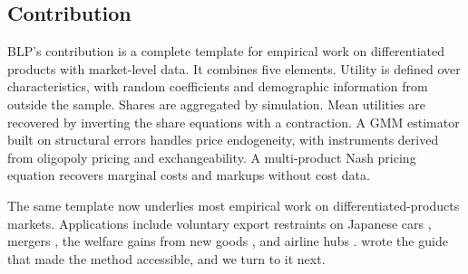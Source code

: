 \subsection{Contribution}\label{sec:08-blp95-contrib}

BLP's contribution is a complete template for empirical work on differentiated products with market-level
data. It combines five elements. Utility is defined over characteristics, with random coefficients and
demographic information from outside the sample. Shares are aggregated by simulation. Mean utilities
are recovered by inverting the share equations with a contraction. A GMM estimator built on structural
errors handles price endogeneity, with instruments derived from oligopoly pricing and exchangeability.
A multi-product Nash pricing equation recovers marginal costs and markups without cost data.

The same template now underlies most empirical work on differentiated-products markets. Applications
include voluntary export restraints on Japanese cars \citep{BerryLevinsohnPakes1999}, mergers
\citep[\cref{ch:mergers}]{Nevo2000b}, the welfare gains from new goods
\citep[\cref{ch:newgoods}]{Petrin2002}, and airline hubs \citep[\cref{ch:airlines}]{BerryCarnallSpiller2006}.
\citet{Nevo2000a} wrote the guide that made the method accessible, and we turn to it next.

